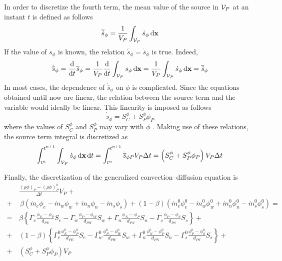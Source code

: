 In order to discretize the fourth term, the mean value of the source in $\mathcal{V}_{P}$ at an instant $t$ is defined as follows
\begin{equation}
	\overline{\dot{s}}_\phi = 
	\frac{1}{V_P} \int_{\mathcal{V}_{P}} \dot{s}_\phi \dd{\vb{x}}
\end{equation}
If the value of $s_\phi$ is known, the relation $\overline{\dot{s}}_\phi = \dot{\overline{s}}_\phi$ is true. Indeed,
\begin{equation}
	\dot{\overline{s}}_\phi = 
	\frac{\dd}{\dd{t}} \overline{s}_\phi = 
	\frac{1}{V_P} \frac{\dd}{\dd{t}} \int_{\mathcal{V}_{P}} s_\phi \dd{\vb{x}} = 
	\frac{1}{V_P} \int_{\mathcal{V}_{P}} \dot{s}_\phi \dd{\vb{x}} = 
	\overline{\dot{s}}_\phi
\end{equation}
In most cases, the dependence of $\dot{\overline{s}}_\phi$ on $\phi$ is complicated. Since the equations obtained until now are linear, the relation between the source term and the variable would ideally be linear. This linearity is imposed as follows
\begin{equation}
	\dot{\overline{s}}_\phi = S_C^\phi + S_P^\phi \phi_P
\end{equation}
where the values of $S_C^\phi$ and $S_P^\phi$ may vary with $\phi$ \cite{patankar2008numerical}. Making use of these relations, the source term integral is discretized as
\begin{equation}
	\int_{t^n}^{t^{n+1}} \int_{\mathcal{V}_{P}} \dot{s}_\phi \dd{\vb{x}} \dd{t} = 
	\int_{t^n}^{t^{n+1}} 
	\dot{\overline{s}}_{\phi P} V_P \Delta t = 
	\left( S_C^\phi + S_P^\phi \phi_P \right) V_P \Delta t
\end{equation}

Finally, the discretization of the generalized convection--diffusion equation is
\begin{align}
	&\frac{(\rho \phi)_P - (\rho \phi)_P^0}{\Delta t} V_P + \nonumber \\
	+& \,
	\beta \left( \dot{m}_e \phi_e - \dot{m}_w \phi_w + \dot{m}_n \phi_n - \dot{m}_s \phi_s \right) + 
	(1 - \beta) 
	\left( \dot{m}_e^0 \phi_e^0 - \dot{m}_w^0 \phi_w^0 + \dot{m}_n^0 \phi_n^0 - \dot{m}_s^0 \phi_s^0 \right) =  \nonumber \\
	= \, 
	&\beta 
	\left\{ 
	\Gamma_e \frac{\phi_E - \phi_P}{d_{PE}} S_e - \Gamma_w \frac{\phi_P - \phi_W}{d_{PW}} S_w +
	\Gamma_n \frac{\phi_N - \phi_P}{d_{PN}} S_n - \Gamma_s \frac{\phi_P - \phi_S}{d_{PS}} S_s 
	\right\} + \nonumber \\
	+ \, &(1 - \beta)
	\left\{ 
	\Gamma_e^0 \frac{\phi_E^0 - \phi_P^0}{d_{PE}} S_e - \Gamma_w^0 \frac{\phi_P^0 - \phi_W^0}{d_{PW}} S_w +
	\Gamma_n^0 \frac{\phi_N^0 - \phi_P^0}{d_{PN}} S_n - \Gamma_s^0 \frac{\phi_P^0 - \phi_S^0}{d_{PS}} S_s 
	\right\} + \nonumber \\
	+ \, &\left( S_C^\phi + S_P^\phi \phi_P \right) V_P
\end{align}


